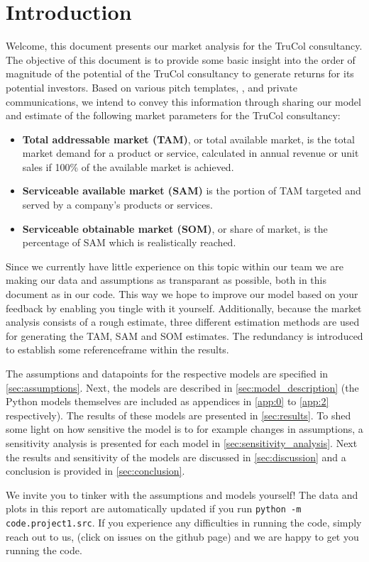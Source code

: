 \section{Introduction}\label{sec:intro}
Welcome, this document presents our market analysis for the TruCol consultancy. The objective of this document is to provide some basic insight into the order of magnitude of the potential of the TruCol consultancy to generate returns for its potential investors. Based on various pitch templates, \cite{kamps2020}, and private communications, we intend to convey this information through sharing our model and estimate of the following market parameters for the TruCol consultancy:

\begin{itemize}
	\item \textbf{Total addressable market (TAM)}, or total available market, is the total market demand for a product or service, calculated in annual revenue or unit sales if 100\% of the available market is achieved\cite{tam_sam_som}.
	\item \textbf{Serviceable available market (SAM)} is the portion of TAM targeted and served by a company's products or services\cite{tam_sam_som}.
	\item \textbf{Serviceable obtainable market (SOM)}, or share of market, is the percentage of SAM which is realistically reached\cite{tam_sam_som}.
\end{itemize}


\noindent Since we currently have little experience on this topic within our team we are making our data and assumptions as transparant as possible, both in this document as in our code. This way we hope to improve our model based on your feedback by enabling you tingle with it yourself. Additionally, because the market analysis consists of a rough estimate, three different estimation methods are used for generating the TAM, SAM and SOM estimates. The redundancy is introduced to establish some referenceframe within the results. %

The assumptions and datapoints for the respective models are specified in \cref{sec:assumptions}. Next, the models are described in \cref{sec:model_description} (the Python models themselves are included as appendices in \cref{app:0} to \cref{app:2} respectively). The results of these models are presented in \cref{sec:results}. To shed some light on how sensitive the model is to for example changes in assumptions, a sensitivity analysis is presented for each model in \cref{sec:sensitivity_analysis}. Next the results and sensitivity of the models are discussed in \cref{sec:discussion} and a conclusion is provided in \cref{sec:conclusion}.

We invite you to tinker with the assumptions and models yourself! The data and plots in this report are automatically updated if you run \verb+python -m code.project1.src+. If you experience any difficulties in running the code, simply reach out to us, (click on issues on the github page) and we are happy to get you running the code.
